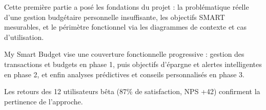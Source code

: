 Cette première partie a posé les fondations du projet : la problématique réelle d'une gestion budgétaire personnelle insuffisante, les objectifs SMART mesurables, et le périmètre fonctionnel via les diagrammes de contexte et cas d'utilisation.

My Smart Budget vise une couverture fonctionnelle progressive : gestion des transactions et budgets en phase 1, puis objectifs d'épargne et alertes intelligentes en phase 2, et enfin analyses prédictives et conseils personnalisés en phase 3.

Les retours des 12 utilisateurs bêta (87\% de satisfaction, NPS +42) confirment la pertinence de l'approche.
